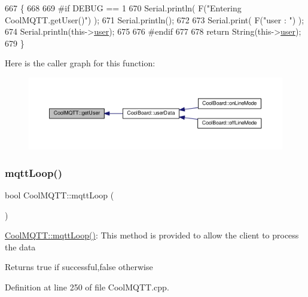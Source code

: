 \begin{DoxyCode}
667 \{
668 
669 \textcolor{preprocessor}{#if DEBUG == 1 }
670     Serial.println( F(\textcolor{stringliteral}{"Entering CoolMQTT.getUser()"}) );
671     Serial.println();
672     
673     Serial.print( F(\textcolor{stringliteral}{"user : "}) );
674     Serial.println(this->\hyperlink{class_cool_m_q_t_t_a8cd47e45d457f908d4b4390b35aaee83}{user});
675 
676 \textcolor{preprocessor}{#endif}
677 
678     \textcolor{keywordflow}{return} String(this->\hyperlink{class_cool_m_q_t_t_a8cd47e45d457f908d4b4390b35aaee83}{user});
679 \}
\end{DoxyCode}
Here is the caller graph for this function\+:\nopagebreak
\begin{figure}[H]
\begin{center}
\leavevmode
\includegraphics[width=350pt]{d0/dd0/class_cool_m_q_t_t_a373cc92fca7760d886f02d8a6e5b3f63_icgraph}
\end{center}
\end{figure}
\mbox{\label{class_cool_m_q_t_t_aa5eaae967b562b62cbcf2b8d81f6e5d5}} 
\subsubsection{\texorpdfstring{mqtt\+Loop()}{mqttLoop()}}
{\footnotesize\ttfamily bool Cool\+M\+Q\+T\+T\+::mqtt\+Loop (\begin{DoxyParamCaption}{ }\end{DoxyParamCaption})}

\hyperlink{class_cool_m_q_t_t_aa5eaae967b562b62cbcf2b8d81f6e5d5}{Cool\+M\+Q\+T\+T\+::mqtt\+Loop()}\+: This method is provided to allow the client to process the data

\begin{DoxyReturn}{Returns}
true if successful,false otherwise 
\end{DoxyReturn}


Definition at line 250 of file Cool\+M\+Q\+T\+T.\+cpp.


